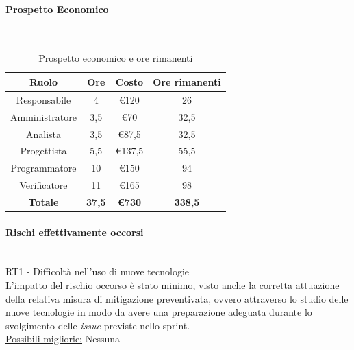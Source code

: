 \documentclass{article}
\begin{document}
                \paragraph{Prospetto Economico}\mbox{}\\
                \begin{table}[H]
                    \centering
                    \begin{tabular}{|c|c|c|c|}
                    \hline
                    \textbf{Ruolo}  & \textbf{Ore}  & \textbf{Costo} & \textbf{Ore rimanenti} \\ \hline
                    Responsabile    & 4             & €120            & 26                     \\ \hline
                    Amministratore  & 3,5           & €70            & 32,5                   \\ \hline
                    Analista        & 3,5           & €87,5          & 32,5                   \\ \hline
                    Progettista     & 5,5           & €137,5         & 55,5                   \\ \hline
                    Programmatore   & 10            & €150           & 94                    \\ \hline
                    Verificatore    & 11            & €165           & 98                    \\ \hline
                    \textbf{Totale} & \textbf{37,5} & \textbf{\euro730}   & \textbf{338,5}         \\ \hline
                    \end{tabular}
                    \caption{Prospetto economico e ore rimanenti}
                \end{table}


                \paragraph{Rischi effettivamente occorsi}\mbox{}\\
                RT1 - Difficoltà nell’uso di nuove tecnologie \\
                L’impatto del rischio occorso è stato minimo, visto anche la corretta attuazione della relativa misura di mitigazione preventivata, ovvero attraverso lo studio delle nuove tecnologie in modo da avere una preparazione adeguata durante lo svolgimento delle \textit{issue} previste nello sprint. \\
                \underline{Possibili migliorie:} Nessuna
\end{document}
